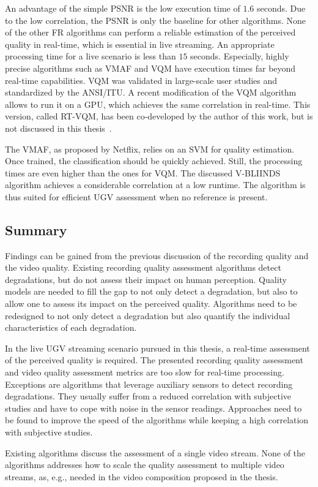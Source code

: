An advantage of the simple \ac{PSNR} is the low execution time of $1.6$ seconds.
Due to the low correlation, the \ac{PSNR} is only the baseline for other algorithms.
None of the other \ac{FR} algorithms can perform a reliable estimation of the perceived quality in real-time, which is essential in live streaming.
An appropriate processing time for a live scenario is less than $15$ seconds. 
Especially, highly precise algorithms such as \ac{VMAF} and \ac{VQM} have execution times far beyond real-time capabilities.
\ac{VQM} was validated in large-scale user studies and standardized by the \ac{ANSI}/\ac{ITU}.
A recent modification of the \ac{VQM} algorithm allows to run it on a \ac{GPU}, which achieves the same correlation in real-time. This version, called \ac{RT-VQM}, has been co-developed by the author of this work, but is not discussed in this thesis~\cite{Wichtlhuber2016}. 

The \ac{VMAF}, as proposed by Netflix, relies on an \ac{SVM} for quality estimation. 
Once trained, the classification should be quickly achieved.
Still, the processing times are even higher than the ones for \ac{VQM}.
The discussed \ac{V-BLIINDS} algorithm achieves a considerable correlation at a low runtime.
The algorithm is thus suited for efficient \ac{UGV} assessment when no reference is present.
\subsection{Summary}
Findings can be gained from the previous discussion of the recording quality and the video quality.
Existing recording quality assessment algorithms detect degradations, but do not assess their impact on human perception.
Quality models are needed to fill the gap to not only detect a degradation, but also to allow one to assess its impact on the perceived quality.
Algorithms need to be redesigned to not only detect a degradation but also quantify the individual characteristics of each degradation.

In the live \ac{UGV} streaming scenario pursued in this thesis, a real-time assessment of the perceived quality is required.
The presented recording quality assessment and video quality assessment metrics are too slow for real-time processing.
Exceptions are algorithms that leverage auxiliary sensors to detect recording degradations.
They usually suffer from a reduced correlation with subjective studies and have to cope with noise in the sensor readings.
Approaches need to be found to improve the speed of the algorithms while keeping a high correlation with subjective studies. 

Existing algorithms discuss the assessment of a single video stream.
None of the algorithms addresses how to scale the quality assessment to multiple video streams, as, e.g., needed in the video composition proposed in the thesis.
